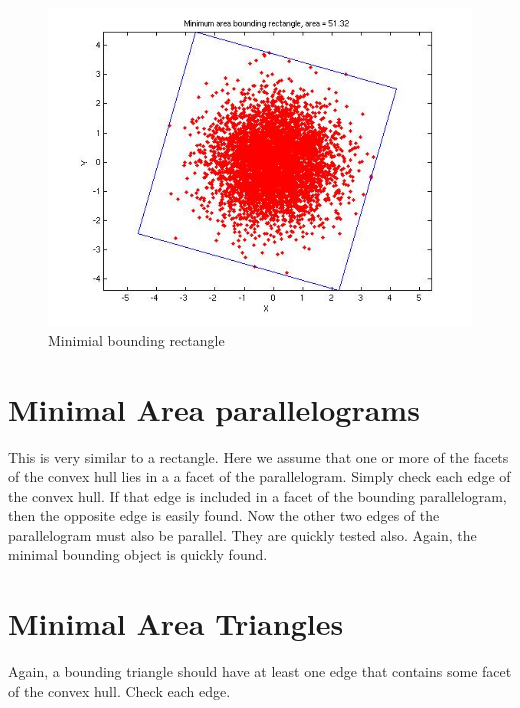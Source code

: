 \documentclass[a4paper,11pt]{article}
\begin{document}
\begin{figure}
\centering
    \includegraphics[width=5in]{rect.jpg}
        \caption{Minimial bounding rectangle}
\end{figure}

\bigskip

\section{Minimal Area parallelograms}

This is very similar to a rectangle. Here we assume that one or more of the facets of the convex hull lies in a a facet of the parallelogram. Simply check each edge of the convex hull. If that edge is included in a facet of the bounding parallelogram, then the opposite edge is easily found. Now the other two edges of the parallelogram must also be parallel. They are quickly tested also. Again, the minimal bounding object is quickly found.

\section{Minimal Area Triangles}

Again, a bounding triangle should have at least one edge that contains some facet of the convex hull. Check each edge.
\end{document}
